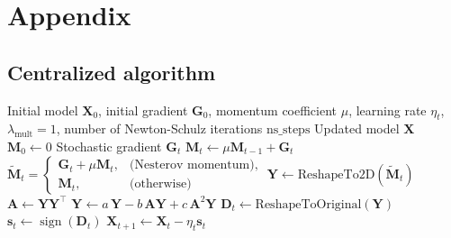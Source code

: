 \documentclass{article}
\begin{document}
\section{Appendix}

\subsection{Centralized algorithm}\label{app:central_alg}
\begin{algorithm}
\caption{SignMuon}
\begin{algorithmic}[1]
\Require Initial model $\mathbf{X}_0$, initial gradient $\mathbf{G}_0$, momentum coefficient $\mu$, learning rate $\eta_t$, $\lambda_{\mathrm{mult}}=1$, number of Newton-Schulz iterations $\mathrm{ns\_steps}$
\Ensure Updated model $\mathbf{X}$
\State $\mathbf{M}_0 \gets 0$ 
    \State Stochastic gradient $\mathbf{G}_t$
    \State $\mathbf{M}_t \gets \mu \mathbf{M}_{t-1} + \mathbf{G}_t$ 
    \State $\tilde{\mathbf{M}}_t =
    \begin{cases} 
        \mathbf{G}_t + \mu \mathbf{M}_t, & \text{(Nesterov momentum)}, \\
        \mathbf{M}_t, & \text{(otherwise)}
    \end{cases}$
    \State $\mathbf{Y} \gets \text{ReshapeTo2D}(\tilde{\mathbf{M}}_t)$ 
     
        \State $\mathbf{A} \gets \mathbf{Y} \mathbf{Y}^\top$
        \State $\mathbf{Y} \gets a\,\mathbf{Y} - b\,\mathbf{A}\mathbf{Y} + c\,\mathbf{A}^2\mathbf{Y}$
    \EndFor
    \State $\mathbf{D}_t \gets \text{ReshapeToOriginal}(\mathbf{Y})$ 
    \State $\mathbf{s}_t \gets \operatorname{sign}(\mathbf{D}_t)$ 
    \State $\mathbf{X}_{t+1} \gets \mathbf{X}_t - \eta_t \mathbf{s}_t$ 
\EndFor
\label{central_alg}
\end{algorithmic}
\end{algorithm}
\end{document}
